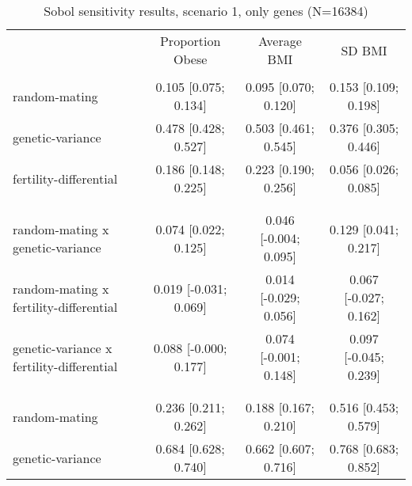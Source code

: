 
    \begin{table}[htp]
    \renewcommand{\arraystretch}{1.3}
    \setlength{\tabcolsep}{3pt}
    \caption{Sobol sensitivity results, scenario 1, only genes (N=16384)}
    \label{tab:sobol-snp}
    \footnotesize
    \centering
    \begin{threeparttable}
    \begin{tabular}{lccc}
    \hline
    \addlinespace
    & Proportion Obese & Average BMI & SD BMI \\
    \addlinespace
    \hline
    \addlinespace[6pt]
    \multicolumn{4}{l}{\hspace{1em} S1} \\
\hspace{1.5em} random-mating & 0.105 [0.075; 0.134]   & 0.095 [0.070; 0.120]   & 0.153 [0.109; 0.198] \\
	  \hspace{1.5em} genetic-variance & 0.478 [0.428; 0.527]   & 0.503 [0.461; 0.545]   & 0.376 [0.305; 0.446] \\
	  \hspace{1.5em} fertility-differential & 0.186 [0.148; 0.225]   & 0.223 [0.190; 0.256]   & 0.056 [0.026; 0.085] \\
	 \\
    \addlinespace[12pt]
    \multicolumn{4}{l}{\hspace{1em} S2} \\ 
\hspace{1.5em} random-mating x genetic-variance & 0.074 [0.022; 0.125]   & 0.046 [-0.004; 0.095]   & 0.129 [0.041; 0.217] \\
	  \hspace{1.5em} random-mating x fertility-differential & 0.019 [-0.031; 0.069]   & 0.014 [-0.029; 0.056]   & 0.067 [-0.027; 0.162] \\
	  \hspace{1.5em} genetic-variance x fertility-differential & 0.088 [-0.000; 0.177]   & 0.074 [-0.001; 0.148]   & 0.097 [-0.045; 0.239] \\
	 \\
    \addlinespace[12pt]
    \multicolumn{4}{l}{\hspace{1em} ST} \\ 
\hspace{1.5em} random-mating & 0.236 [0.211; 0.262]   & 0.188 [0.167; 0.210]   & 0.516 [0.453; 0.579] \\
	  \hspace{1.5em} genetic-variance & 0.684 [0.628; 0.740]   & 0.662 [0.607; 0.716]   & 0.768 [0.683; 0.852] \\

\end{tabular}
\end{threeparttable}
\end{table}
